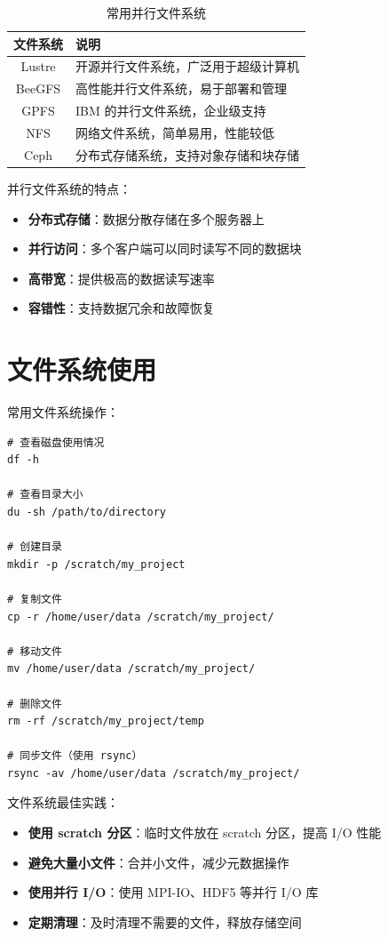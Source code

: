 \documentclass[12pt,UTF8]{ctexbook}
\begin{document}
\begin{table}[htbp]
    \centering
    \caption{常用并行文件系统}
    \begin{tabular}{|c|p{8cm}|}
        \hline
        \textbf{文件系统} & \textbf{说明} \\
        \hline
        Lustre & 开源并行文件系统，广泛用于超级计算机 \\
        \hline
        BeeGFS & 高性能并行文件系统，易于部署和管理 \\
        \hline
        GPFS & IBM 的并行文件系统，企业级支持 \\
        \hline
        NFS & 网络文件系统，简单易用，性能较低 \\
        \hline
        Ceph & 分布式存储系统，支持对象存储和块存储 \\
        \hline
    \end{tabular}
\end{table}

并行文件系统的特点：
\begin{itemize}
    \item \textbf{分布式存储}：数据分散存储在多个服务器上
    \item \textbf{并行访问}：多个客户端可以同时读写不同的数据块
    \item \textbf{高带宽}：提供极高的数据读写速率
    \item \textbf{容错性}：支持数据冗余和故障恢复
\end{itemize}

\section{文件系统使用}
\label{sec:file_system_usage}

常用文件系统操作：
\begin{verbatim}
# 查看磁盘使用情况
df -h

# 查看目录大小
du -sh /path/to/directory

# 创建目录
mkdir -p /scratch/my_project

# 复制文件
cp -r /home/user/data /scratch/my_project/

# 移动文件
mv /home/user/data /scratch/my_project/

# 删除文件
rm -rf /scratch/my_project/temp

# 同步文件（使用 rsync）
rsync -av /home/user/data /scratch/my_project/
\end{verbatim}

文件系统最佳实践：
\begin{itemize}
    \item \textbf{使用 scratch 分区}：临时文件放在 scratch 分区，提高 I/O 性能
    \item \textbf{避免大量小文件}：合并小文件，减少元数据操作
    \item \textbf{使用并行 I/O}：使用 MPI-IO、HDF5 等并行 I/O 库
    \item \textbf{定期清理}：及时清理不需要的文件，释放存储空间
\end{itemize}
\end{document}

